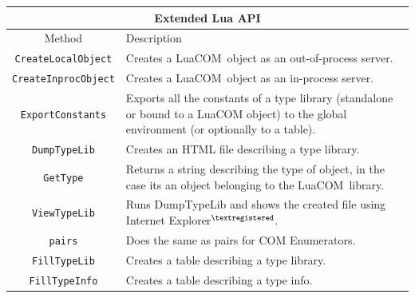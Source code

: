 \documentclass[11pt,a4paper,english]{report}
\newcommand{\ttext}[1]{#1}
\newcommand{\ttitle}[1]{#1}
\newcommand{\tlinetitB}[2]{#1 & #2 \\ \hline \hline}
\newcommand{\ttext}[1]{{\raggedright #1 \\}}
\newcommand{\ttitle}[1]{\begin{minipage}{\colA cm} \centering \bf #1 \end{minipage}}
\newcommand{\tlinetitB}[2]{\ttitle{#1} & \ttitle{#2} \\ \hline \hline}
\newcommand{\techname}[1]{\mbox{#1}}
\newcommand{\luacom}{\techname{LuaCOM}}
\newcommand{\registered}{$^{\textregistered}$}
\begin{document}

  \begin{center}
  \begin{tabular}{|c|p{7cm}|}

  \multicolumn{2}{c}{\large Extended Lua API} \\
  \hline

  \tlinetitB{Method}{Description}

  \verb+CreateLocalObject+
    & \ttext{Creates a \luacom\ object as an out-of-process server.} \\ \hline

  \verb+CreateInprocObject+
    & \ttext{Creates a \luacom\ object as an in-process server.} \\ \hline

  \verb+ExportConstants+ & \ttext{Exports all the constants of a type
  library (standalone or bound to a LuaCOM object) to the global
  environment (or optionally to a table).} \\ \hline

  \verb+DumpTypeLib+
    & \ttext{Creates an HTML file describing a type library.} \\ \hline

  \verb+GetType+
    & \ttext{Returns a string describing the type of object, in the
    case its an object belonging to the \luacom\ library.} \\ \hline

  \verb+ViewTypeLib+
    & \ttext{Runs DumpTypeLib and shows the created file using
    Internet Explorer\registered.} \\ \hline

  \verb+pairs+ & \ttext{Does the same as pairs for COM Enumerators.}
  \\ \hline

  \verb+FillTypeLib+ & \ttext{Creates a table describing a type
    library.}
    \\ \hline

  \verb+FillTypeInfo+
    & \ttext{Creates a table describing a type info.} \\ \hline

  \end{tabular}
  \end{center}




\end{document}
